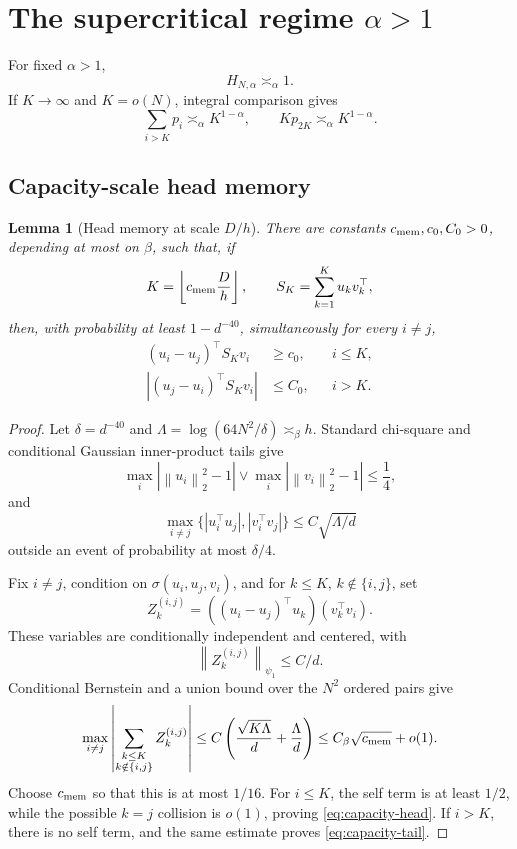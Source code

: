 \documentclass[11pt]{article}
\newtheorem{lemma}[theorem]{Lemma}
\theoremstyle{remark}
\newcommand{\norm}[1]{\left\lVert #1\right\rVert}
\begin{document}
\section{The supercritical regime \(\alpha>1\)}
\label{sec:supercritical}

For fixed \(\alpha>1\),
\[
 H_{N,\alpha}\asymp_\alpha1.
\]
If \(K\to\infty\) and \(K=o(N)\), integral comparison gives
\begin{equation}
 \sum_{i>K}p_i\asymp_\alpha K^{1-\alpha},
 \qquad
 Kp_{2K}\asymp_\alpha K^{1-\alpha}.
 \label{eq:super-tail}
\end{equation}

\subsection{Capacity-scale head memory}

\begin{lemma}[Head memory at scale \(D/h\)]
\label{lem:capacity-memory}
There are constants \(c_{\rm mem},c_0,C_0>0\), depending at most on
\(\beta\), such that, if
\[
 K=\left\lfloor c_{\rm mem}\frac{D}{h}\right\rfloor,
 \qquad
 S_K=\sum_{k=1}^Ku_kv_k^\top,
\]
then, with probability at least \(1-d^{-40}\), simultaneously for
every \(i\neq j\),
\begin{align}
 (u_i-u_j)^\top S_Kv_i&\geq c_0,
 &&i\leq K,
 \label{eq:capacity-head}\\
 |(u_j-u_i)^\top S_Kv_i|&\leq C_0,
 &&i>K.
 \label{eq:capacity-tail}
\end{align}
\end{lemma}

\begin{proof}
Let \(\delta=d^{-40}\) and
\(\Lambda=\log(64N^2/\delta)\asymp_\beta h\).
Standard chi-square and conditional Gaussian inner-product tails give
\[
 \max_i\left|
 \norm{u_i}_2^2-1\right|
 \vee
 \max_i\left|\norm{v_i}_2^2-1\right|
 \leq\frac14,
\]
and
\[
 \max_{i\neq j}
 \{|u_i^\top u_j|,|v_i^\top v_j|\}
 \leq C\sqrt{\Lambda/d}
\]
outside an event of probability at most \(\delta/4\).

Fix \(i\neq j\), condition on
\(\sigma(u_i,u_j,v_i)\), and for
\(k\leq K\), \(k\notin\{i,j\}\), set
\[
 Z_k^{(i,j)}
 =((u_i-u_j)^\top u_k)(v_k^\top v_i).
\]
These variables are conditionally independent and centered, with
\[
 \norm{Z_k^{(i,j)}}_{\psi_1}\leq C/d.
\]
Conditional Bernstein and a union bound over the \(N^2\) ordered
pairs give
\[
 \max_{i\neq j}
 \left|
 \sum_{\substack{k\leq K\\k\notin\{i,j\}}}
 Z_k^{(i,j)}
 \right|
 \leq
 C\left(\frac{\sqrt{K\Lambda}}d+\frac{\Lambda}{d}\right)
 \leq C_\beta\sqrt{c_{\rm mem}}+o(1).
\]
Choose \(c_{\rm mem}\) so that this is at most \(1/16\).
For \(i\leq K\), the self term is at least \(1/2\), while the possible
\(k=j\) collision is \(o(1)\), proving
\eqref{eq:capacity-head}.  If \(i>K\), there is no self term, and the
same estimate proves \eqref{eq:capacity-tail}.
\end{proof}
\end{document}
